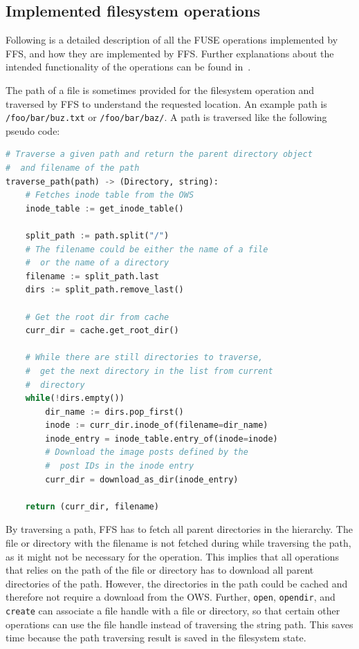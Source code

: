 \subsection{Implemented filesystem operations}
\label{subsec:file_op}
Following is a detailed description of all the FUSE operations implemented by FFS, and how they are implemented by FFS. Further explanations about the intended functionality of the operations can be found in \,\cite{kuenningCS135FUSEDocumentation2010}. 

The path of a file is sometimes provided for the filesystem operation and traversed by FFS to understand the requested location. An example path is \texttt{/foo/bar/buz.txt} or \texttt{/foo/bar/baz/}. A path is traversed like the following pseudo code:
\begin{lstlisting}[language=python, caption={Pseudocode of traversing a given path, returning the \texttt{Directory} and the filename}, label=lst:traverse_path,breaklines=true]
# Traverse a given path and return the parent directory object
#  and filename of the path
traverse_path(path) -> (Directory, string):
	# Fetches inode table from the OWS
	inode_table := get_inode_table()
	
	split_path := path.split("/")
	# The filename could be either the name of a file 
	#  or the name of a directory
	filename := split_path.last
	dirs := split_path.remove_last()

	# Get the root dir from cache
	curr_dir = cache.get_root_dir()

	# While there are still directories to traverse,
	#  get the next directory in the list from current
	#  directory
	while(!dirs.empty())
		dir_name := dirs.pop_first()
		inode := curr_dir.inode_of(filename=dir_name)
		inode_entry = inode_table.entry_of(inode=inode)
		# Download the image posts defined by the 
		#  post IDs in the inode entry
		curr_dir = download_as_dir(inode_entry)
	
	return (curr_dir, filename)

\end{lstlisting}

By traversing a path, FFS has to fetch all parent directories in the hierarchy. The file or directory with the filename is not fetched during while traversing the path, as it might not be necessary for the operation. This implies that all operations that relies on the path of the file or directory has to download all parent directories of the path. However, the directories in the path could be cached and therefore not require a download from the OWS. Further, \texttt{open}, \texttt{opendir}, and \texttt{create} can associate a file handle with a file or directory, so that certain other operations can use the file handle instead of traversing the string path. This saves time because the path traversing result is saved in the filesystem state.


